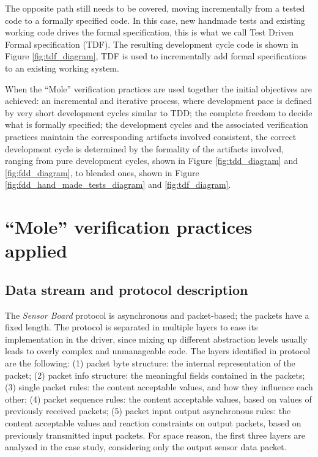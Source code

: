 \documentclass[english]{lni}
\newcommand{\SB}{\emph{Sensor Board}\xspace}
\begin{document}
The opposite path still needs to be covered, moving incrementally from a tested code to a formally specified code.
In this case, new handmade tests and existing working code drives the formal specification, this is what we call Test Driven Formal specification (TDF).
The resulting development cycle code is shown in Figure \ref{fig:tdf_diagram}, TDF is used to incrementally add formal specifications to an existing working system.

When the ``Mole'' verification practices are used together the initial objectives are achieved: an incremental and iterative process, where development pace is defined by very short development cycles similar to TDD; the complete freedom to decide what is formally specified; the development cycles and the associated verification practices maintain the corresponding artifacts involved consistent, the correct development cycle is determined by the formality of the artifacts involved, ranging from pure development cycles, shown in Figure \ref{fig:tdd_diagram} and \ref{fig:fdd_diagram}, to blended ones, shown in Figure \ref{fig:fdd_hand_made_tests_diagram} and \ref{fig:tdf_diagram}.



\section{``Mole'' verification practices applied}
\label{sec:a_complex_case_study}

\subsection{Data stream and protocol description}
\label{subsec:data_stream_and_protocol_description}

The \SB protocol is asynchronous and packet-based; the packets have a fixed length.  
The protocol is separated in multiple layers to ease its implementation in the driver, since mixing up different abstraction levels usually leads to overly complex and unmanageable code.  
The layers identified in protocol are the following: (1) packet byte structure: the internal representation of the packet; (2) packet info structure: the meaningful fields contained in the packets; (3) single packet rules: the content acceptable values, and how they influence each other; (4) packet sequence rules: the content acceptable values, based on values of previously received packets; (5) packet input output asynchronous rules: the content acceptable values and reaction constraints on output packets, based on previously transmitted input packets.
For space reason, the first three layers are analyzed in the case study, considering only the output sensor data packet.
\end{document}
